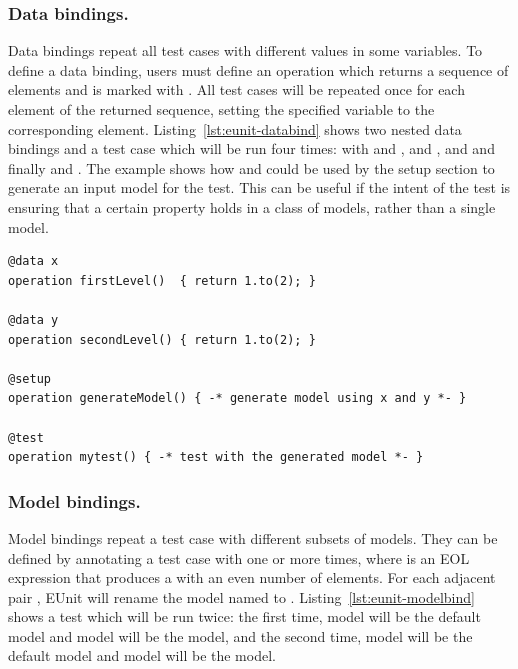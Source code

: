 \subsubsection{Data bindings.} Data bindings repeat all test cases with different values in some variables. To define a data binding, users must define an operation which returns a sequence of elements and is marked with . All test cases will be repeated once for each element of the returned sequence, setting the specified variable to the corresponding element. Listing~\ref{lst:eunit-databind} shows two nested data bindings and a test case which will be run four times: with  and ,  and ,  and  and finally  and . The example shows how  and  could be used by the setup section to generate an input model for the test. This can be useful if the intent of the test is ensuring that a certain property holds in a class of models, rather than a single model.

\begin{lstlisting}[language=EOL,caption=Example of a 2-level data binding,label=lst:eunit-databind,columns=fixed,float]
@data x
operation firstLevel()  { return 1.to(2); }

@data y
operation secondLevel() { return 1.to(2); }

@setup
operation generateModel() { -* generate model using x and y *- }

@test
operation mytest() { -* test with the generated model *- }
\end{lstlisting}

\subsubsection{Model bindings.} Model bindings repeat a test case with different subsets of models. They can be defined by annotating a test case with  one or more times, where  is an EOL expression that produces a  with an even number of elements. For each adjacent pair , EUnit will rename the model named  to . Listing~\ref{lst:eunit-modelbind} shows a test which will be run twice: the first time, model  will be the default model and model  will be the  model, and the second time, model  will be the default model and model  will be the  model.

